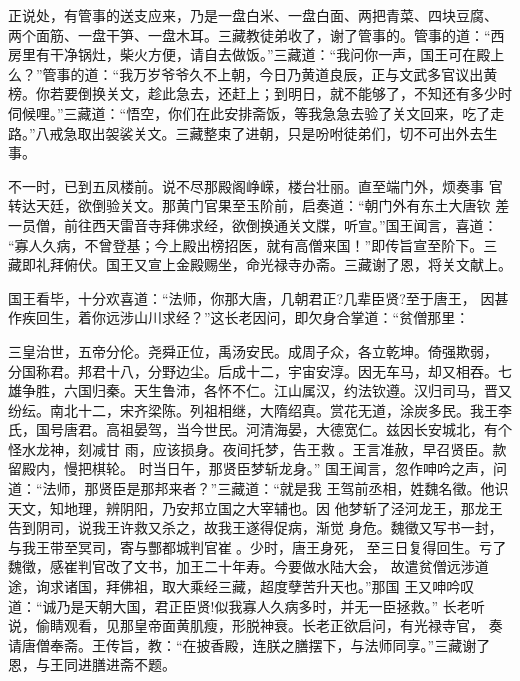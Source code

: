 正说处，有管事的送支应来，乃是一盘白米、一盘白面、两把青菜、四块豆腐、
两个面筋、一盘干笋、一盘木耳。三藏教徒弟收了，谢了管事的。管事的道：“西
房里有干净锅灶，柴火方便，请自去做饭。”三藏道：“我问你一声，国王可在殿上
么？”管事的道：“我万岁爷爷久不上朝，今日乃黄道良辰，正与文武多官议出黄
榜。你若要倒换关文，趁此急去，还赶上；到明日，就不能够了，不知还有多少时
伺候哩。”三藏道：“悟空，你们在此安排斋饭，等我急急去验了关文回来，吃了走
路。”八戒急取出袈裟关文。三藏整束了进朝，只是吩咐徒弟们，切不可出外去生
事。

不一时，已到五凤楼前。说不尽那殿阁峥嵘，楼台壮丽。直至端门外，烦奏事
官转达天廷，欲倒验关文。那黄门官果至玉阶前，启奏道：“朝门外有东土大唐钦
差一员僧，前往西天雷音寺拜佛求经，欲倒换通关文牒，听宣。”国王闻言，喜道：
“寡人久病，不曾登基；今上殿出榜招医，就有高僧来国！”即传旨宣至阶下。三
藏即礼拜俯伏。国王又宣上金殿赐坐，命光禄寺办斋。三藏谢了恩，将关文献上。

国王看毕，十分欢喜道：“法师，你那大唐，几朝君正?几辈臣贤?至于唐王，
因甚作疾回生，着你远涉山川求经？”这长老因问，即欠身合掌道：“贫僧那里：

三皇治世，五帝分伦。尧舜正位，禹汤安民。成周子众，各立乾坤。倚强欺弱，
分国称君。邦君十八，分野边尘。后成十二，宇宙安淳。因无车马，却又相吞。七
雄争胜，六国归秦。天生鲁沛，各怀不仁。江山属汉，约法钦遵。汉归司马，晋又
纷纭。南北十二，宋齐梁陈。列祖相继，大隋绍真。赏花无道，涂炭多民。我王李
氏，国号唐君。高祖晏驾，当今世民。河清海晏，大德宽仁。兹因长安城北，有个
怪水龙神，刻减甘
雨，应该损身。夜间托梦，告王救。王言准赦，早召贤臣。款留殿内，慢把棋轮。
时当日午，那贤臣梦斩龙身。”
国王闻言，忽作呻吟之声，问道：“法师，那贤臣是那邦来者？”三藏道：“就是我
王驾前丞相，姓魏名徵。他识天文，知地理，辨阴阳，乃安邦立国之大宰辅也。因
他梦斩了泾河龙王，那龙王告到阴司，说我王许救又杀之，故我王遂得促病，渐觉
身危。魏徵又写书一封，与我王带至冥司，寄与酆都城判官崔。少时，唐王身死，
至三日复得回生。亏了魏徵，感崔判官改了文书，加王二十年寿。今要做水陆大会，
故遣贫僧远涉道途，询求诸国，拜佛祖，取大乘经三藏，超度孽苦升天也。”那国
王又呻吟叹道：“诚乃是天朝大国，君正臣贤!似我寡人久病多时，并无一臣拯救。”
长老听说，偷睛观看，见那皇帝面黄肌瘦，形脱神衰。长老正欲启问，有光禄寺官，
奏请唐僧奉斋。王传旨，教：“在披香殿，连朕之膳摆下，与法师同享。”三藏谢了
恩，与王同进膳进斋不题。

